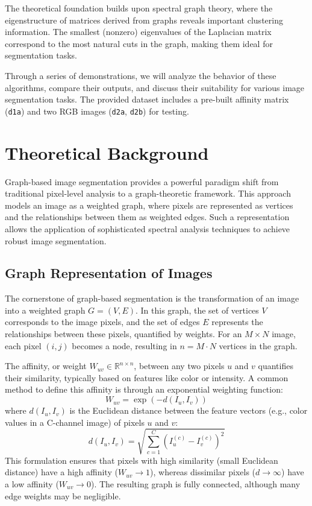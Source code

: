 \documentclass[12pt,a4paper]{article}
\begin{document}
The theoretical foundation builds upon spectral graph theory, where the eigenstructure of matrices derived from graphs reveals important clustering information. The smallest (nonzero) eigenvalues of the Laplacian matrix correspond to the most natural cuts in the graph, making them ideal for segmentation tasks.


Through a series of demonstrations, we will analyze the behavior of these algorithms, compare their outputs, and discuss their suitability for various image segmentation tasks. The provided dataset includes a pre-built affinity matrix (\texttt{d1a}) and two RGB images (\texttt{d2a}, \texttt{d2b}) for testing.






\section{Theoretical Background}

Graph-based image segmentation provides a powerful paradigm shift from traditional pixel-level analysis to a graph-theoretic framework. This approach models an image as a weighted graph, where pixels are represented as vertices and the relationships between them as weighted edges. Such a representation allows the application of sophisticated spectral analysis techniques to achieve robust image segmentation.

\subsection{Graph Representation of Images}
\label{subsec:graph_representation}

The cornerstone of graph-based segmentation is the transformation of an image into a weighted graph $G = (V, E)$. In this graph, the set of vertices $V$ corresponds to the image pixels, and the set of edges $E$ represents the relationships between these pixels, quantified by weights. For an $M \times N$ image, each pixel $(i,j)$ becomes a node, resulting in $n = M \cdot N$ vertices in the graph.

The affinity, or weight $W_{uv} \in \mathbb{R}^{n \times n}$, between any two pixels $u$ and $v$ quantifies their similarity, typically based on features like color or intensity. A common method to define this affinity is through an exponential weighting function:
\begin{equation}
W_{uv} = \exp(-d(I_u, I_v))
\end{equation}
where $d(I_u, I_v)$ is the Euclidean distance between the feature vectors (e.g., color values in a C-channel image) of pixels $u$ and $v$:
\begin{equation}
d(I_u, I_v) = \sqrt{\sum_{c=1}^{C} (I_u^{(c)} - I_v^{(c)})^2}
\end{equation}
This formulation ensures that pixels with high similarity (small Euclidean distance) have a high affinity ($W_{uv} \rightarrow 1$), whereas dissimilar pixels ($d \rightarrow \infty$) have a low affinity ($W_{uv} \rightarrow 0$). The resulting graph is fully connected, although many edge weights may be negligible.
\end{document}
